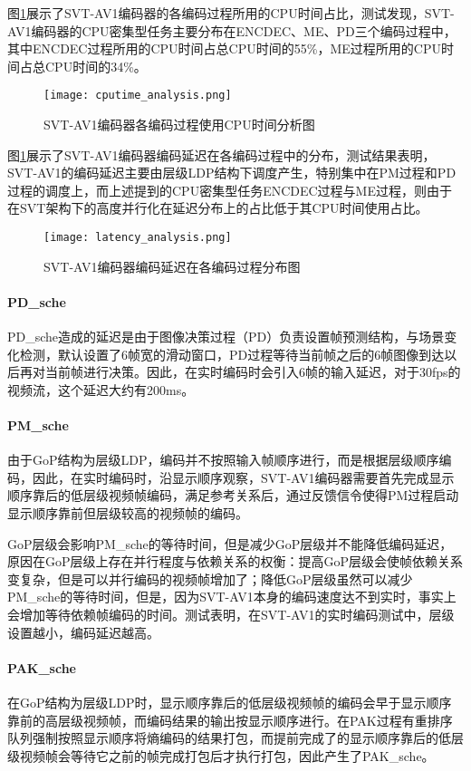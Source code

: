 图\ref{fig:cpu-ana}展示了SVT-AV1编码器的各编码过程所用的CPU时间占比，测试发现，SVT-AV1编码器的CPU密集型任务主要分布在ENCDEC、ME、PD三个编码过程中，其中ENCDEC过程所用的CPU时间占总CPU时间的55\%，ME过程所用的CPU时间占总CPU时间的34\%。

\begin{figure}[!htp]
		\centering
		\texttt{[image: cputime\_analysis.png]}
		\caption{SVT-AV1编码器各编码过程使用CPU时间分析图}
		\label{fig:cpu-ana}
\end{figure}
图\ref{fig:cpu-ana}展示了SVT-AV1编码器编码延迟在各编码过程中的分布，测试结果表明，SVT-AV1的编码延迟主要由层级LDP结构下调度产生，特别集中在PM过程和PD过程的调度上，而上述提到的CPU密集型任务ENCDEC过程与ME过程，则由于在SVT架构下的高度并行化在延迟分布上的占比低于其CPU时间使用占比。

\begin{figure}[!htp]
	\centering
	\texttt{[image: latency\_analysis.png]}
	\caption{SVT-AV1编码器编码延迟在各编码过程分布图}
	\label{fig:lat-ana}
\end{figure}

\paragraph{PD\_sche} PD\_sche造成的延迟是由于图像决策过程（PD）负责设置帧预测结构，与场景变化检测，默认设置了6帧宽的滑动窗口，PD过程等待当前帧之后的6帧图像到达以后再对当前帧进行决策。因此，在实时编码时会引入6帧的输入延迟，对于30fps的视频流，这个延迟大约有200ms。

\paragraph{PM\_sche} 由于GoP结构为层级LDP，编码并不按照输入帧顺序进行，而是根据层级顺序编码，因此，在实时编码时，沿显示顺序观察，SVT-AV1编码器需要首先完成显示顺序靠后的低层级视频帧编码，满足参考关系后，通过反馈信令使得PM过程启动显示顺序靠前但层级较高的视频帧的编码。

GoP层级会影响PM\_sche的等待时间，但是减少GoP层级并不能降低编码延迟，原因在GoP层级上存在并行程度与依赖关系的权衡：提高GoP层级会使帧依赖关系变复杂，但是可以并行编码的视频帧增加了；降低GoP层级虽然可以减少PM\_sche的等待时间，但是，因为SVT-AV1本身的编码速度达不到实时，事实上会增加等待依赖帧编码的时间。测试表明，在SVT-AV1的实时编码测试中，层级设置越小，编码延迟越高。

\paragraph{PAK\_sche} 在GoP结构为层级LDP时，显示顺序靠后的低层级视频帧的编码会早于显示顺序靠前的高层级视频帧，而编码结果的输出按显示顺序进行。在PAK过程有重排序队列强制按照显示顺序将熵编码的结果打包，而提前完成了的显示顺序靠后的低层级视频帧会等待它之前的帧完成打包后才执行打包，因此产生了PAK\_sche。

